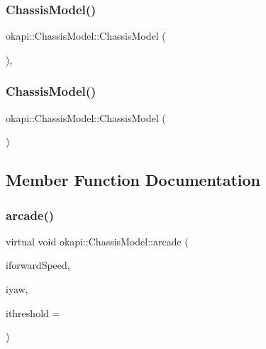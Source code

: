 \subsubsection{\texorpdfstring{ChassisModel()}{ChassisModel()}\hspace{0.1cm}{\footnotesize\ttfamily [1/2]}}
{\footnotesize\ttfamily okapi\+::\+Chassis\+Model\+::\+Chassis\+Model (\begin{DoxyParamCaption}{ }\end{DoxyParamCaption})\hspace{0.3cm}{\ttfamily [explicit]}, {\ttfamily [default]}}

\mbox{\label{classokapi_1_1ChassisModel_a8201eb131b58c99a2b93630758e8367d}} 
\subsubsection{\texorpdfstring{ChassisModel()}{ChassisModel()}\hspace{0.1cm}{\footnotesize\ttfamily [2/2]}}
{\footnotesize\ttfamily okapi\+::\+Chassis\+Model\+::\+Chassis\+Model (\begin{DoxyParamCaption}\item[{const \mbox{\hyperlink{classokapi_1_1ChassisModel}{Chassis\+Model}} \&}]{ }\end{DoxyParamCaption})\hspace{0.3cm}{\ttfamily [delete]}}



\subsection{Member Function Documentation}
\mbox{\label{classokapi_1_1ChassisModel_a632d4c0b74747ab3b9c5a159a36bdd03}} 
\subsubsection{\texorpdfstring{arcade()}{arcade()}}
{\footnotesize\ttfamily virtual void okapi\+::\+Chassis\+Model\+::arcade (\begin{DoxyParamCaption}\item[{double}]{iforward\+Speed,  }\item[{double}]{iyaw,  }\item[{double}]{ithreshold = {} }\end{DoxyParamCaption})\hspace{0.3cm}{\ttfamily [pure virtual]}}

